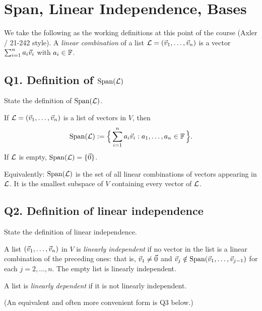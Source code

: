 \section{Span, Linear Independence, Bases}

We take the following as the working definitions at this point of the course
(Axler / 21-242 style). A \emph{linear combination} of a list
$\mathcal{L}=(\vec{v}_1,\ldots,\vec{v}_n)$ is a vector $\sum_{i=1}^n a_i\vec{v}_i$ with $a_i\in\mathbb{F}$.

\subsection{Q1. Definition of $\operatorname{Span}(\mathcal{L})$}

\begin{promptbox}
State the definition of $\operatorname{Span}(\mathcal{L})$.
\end{promptbox}

\begin{coursebox}
\begin{definition*}
If $\mathcal{L}=(\vec{v}_1,\ldots,\vec{v}_n)$ is a list of vectors in $V$, then
\[
\operatorname{Span}(\mathcal{L})
:=\Bigl\{\, \sum_{i=1}^n a_i\vec{v}_i : a_1,\ldots,a_n\in\mathbb{F} \,\Bigr\}.
\]
If $\mathcal{L}$ is empty, $\operatorname{Span}(\mathcal{L})=\{\vec{0}\}$.
\end{definition*}
Equivalently: $\operatorname{Span}(\mathcal{L})$ is the set of all linear combinations
of vectors appearing in $\mathcal{L}$. It is the smallest subspace of $V$ containing
every vector of $\mathcal{L}$.
\end{coursebox}

\subsection{Q2. Definition of linear independence}

\begin{promptbox}
State the definition of linear independence.
\end{promptbox}

\begin{coursebox}
\begin{definition*}
A list $(\vec{v}_1,\ldots,\vec{v}_n)$ in $V$ is \emph{linearly independent} if no vector
in the list is a linear combination of the preceding ones: that is,
$\vec{v}_1\neq\vec{0}$ and $\vec{v}_j\notin\operatorname{Span}(\vec{v}_1,\ldots,\vec{v}_{j-1})$
for each $j=2,\ldots,n$. The empty list is linearly independent.
\end{definition*}
A list is \emph{linearly dependent} if it is not linearly independent.

(An equivalent and often more convenient form is Q3 below.)
\end{coursebox}


